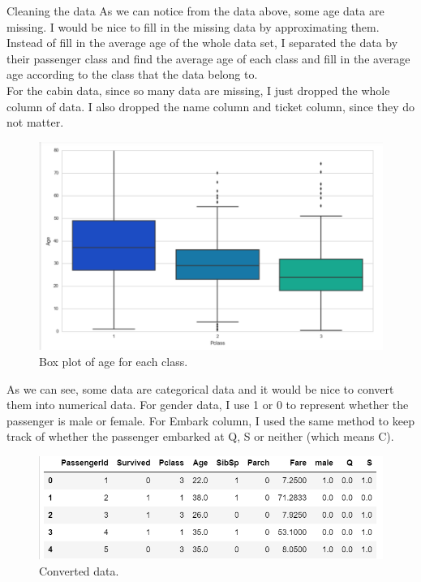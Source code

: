 \documentclass[a4paper,12pt]{article}
\begin{document}
\begin{section}{Cleaning the data}
As we can notice from the data above, some age data are missing. I would be nice to fill in the missing data by approximating them. Instead of fill in the average age of the whole data set, I separated  the data by their passenger class and find the average age of each class and fill in the average age according to the class that the data belong to. \\

For the cabin data, since so many data are missing, I just dropped the whole column of data. I also dropped the name column and ticket column, since they do not matter.

\begin{figure}
  \includegraphics[width=\textwidth]{age_pclass.png}
	\caption{Box plot of age for each class.}
\end{figure}

As we can see, some data are categorical data and it would be nice to convert them into numerical data. For gender data, I use 1 or 0 to represent whether the passenger is male or female. For Embark column, I used the same method to keep track of whether the passenger embarked at Q, S or neither (which means C). 

\begin{figure}
  \includegraphics[width=\textwidth]{converted_data.png}
	\caption{Converted data.}
\end{figure}

\end{section}
\end{document}
